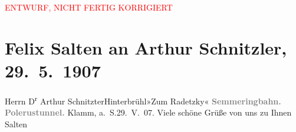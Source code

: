 
\begin{center}
            \textcolor{red}{ENTWURF, NICHT FERTIG KORRIGIERT}
                      \end{center}
            
         \renewcommand{\erwaehnteInstitutionen}{Institutionen: Semmeringbahn}
         \renewcommand{\erwaehnteOrte}{Orte: Hinterbrühl, Hotel Radetzky, Klamm, Kleiner Krausel-Tunnel}
         \renewcommand{\erwaehnteWerke}{}
               \section[Felix Salten an Arthur Schnitzler, 29. 5. 1907]{ Felix Salten an Arthur Schnitzler, 29. 5. 1907}\nopagebreak{}\rehead{ }\begin{ledgroupsized}[t]{13cm}\normalsize\beginnumbering \toendnotes[C]{\smallbreak\pagebreak[2]} 
\pstart{}{\pb}Herrn D\textsuperscript{r} Arthur Schnitzter\pend{}\pstart{}Hinterbrühl\pend{}\pstart{}»Zum Radetzky«\pend{}{\bigskip}\pstart
           \noindent{}\centering{}{\pb}\textcolor{gray}{\textbf{Semmeringbahn. Polerustunnel.}}\pend
           \pstart
           Klamm, a. S.29. V. 07.\pend
           \pstart
           Viele schöne Grüße von uns zu Ihnen\pend
           \pstart \spacefill\mbox{Salten}\pend{}
         
         \endnumbering{}\end{ledgroupsized}\begin{anhang}\end{anhang}\newcommand{\dateiname}{L03487}\newcommand{\titel}{Felix Salten an Arthur Schnitzler, 29. 5. 1907}\newcommand{\editorInnen}{Martin Anton Müller und Laura Untner}
      